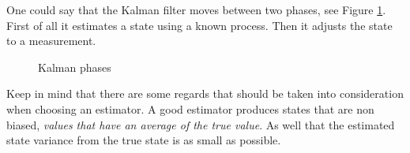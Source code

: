 \documentclass[a4paper,11pt]{kth-mag}
\begin{document}
One could say that the Kalman filter moves between two phases, see Figure \ref{Fig: Kalman phases}. First of all it estimates a state using a known process. Then it adjusts the state to a measurement.

\begin{figure}
\centering
{}
\caption{Kalman phases}
\label{Fig: Kalman phases}
\end{figure}

Keep in mind that there are some regards that should be taken into consideration when choosing an estimator.
A good estimator produces states that are non biased, \emph{values that have an average  of the true value}. As well that the estimated state variance from the true state is as small as possible\cite{Simon2001}.
\end{document}
